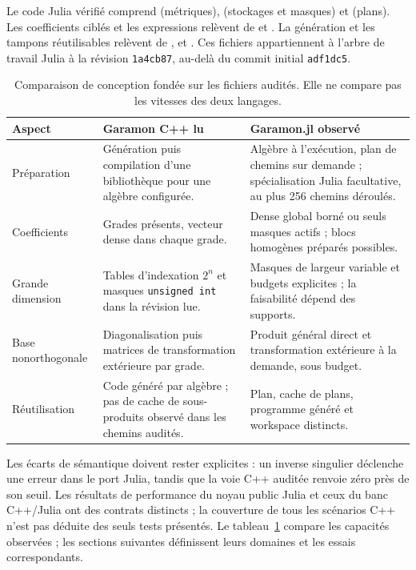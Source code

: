 \documentclass[11pt,a4paper]{article}
\newcommand{\code}[1]{\texttt{#1}}
\begin{document}
Le code Julia vérifié comprend  (métriques),
 (stockages et masques) et 
(plans). Les coefficients ciblés et les expressions relèvent de
 et . La génération et les tampons
réutilisables relèvent de ,  et
. Ces fichiers appartiennent à l'arbre de travail
Julia à la révision \code{1a4cb87}, au-delà du commit initial
\code{adf1dc5}.

\begin{table}[ht]
\centering\small
\begin{tabularx}{\linewidth}{@{}p{31mm}X X@{}}
\toprule
Aspect & Garamon C++ lu & Garamon.jl observé \\
\midrule
Préparation & Génération puis compilation d'une bibliothèque pour une algèbre configurée. & Algèbre à l'exécution, plan de chemins sur demande ; spécialisation Julia facultative, au plus 256 chemins déroulés. \\
Coefficients & Grades présents, vecteur dense dans chaque grade. & Dense global borné ou seuls masques actifs ; blocs homogènes préparés possibles. \\
Grande dimension & Tables d'indexation $2^n$ et masques \code{unsigned int} dans la révision lue. & Masques de largeur variable et budgets explicites ; la faisabilité dépend des supports. \\
Base non\newline orthogonale & Diagonalisation puis matrices de transformation extérieure par grade. & Produit général direct et transformation extérieure à la demande, sous budget. \\
Réutilisation & Code généré par algèbre ; pas de cache de sous-produits observé dans les chemins audités. & Plan, cache de plans, programme généré et workspace distincts. \\
\bottomrule
\end{tabularx}
\caption{Comparaison de conception fondée sur les fichiers audités. Elle ne compare pas les vitesses des deux langages.}
\label{tab:cppjulia}
\end{table}

Les écarts de sémantique doivent rester explicites : un inverse singulier
déclenche une erreur dans le port Julia, tandis que la voie C++ auditée renvoie
zéro près de son seuil. Les résultats de performance du noyau public Julia et
ceux du banc C++/Julia ont des contrats distincts ; la couverture de tous
les scénarios C++ n'est pas déduite des seuls tests présentés. Le
tableau~\ref{tab:cppjulia} compare les capacités observées ; les sections
suivantes définissent leurs domaines et les essais correspondants.
\end{document}
